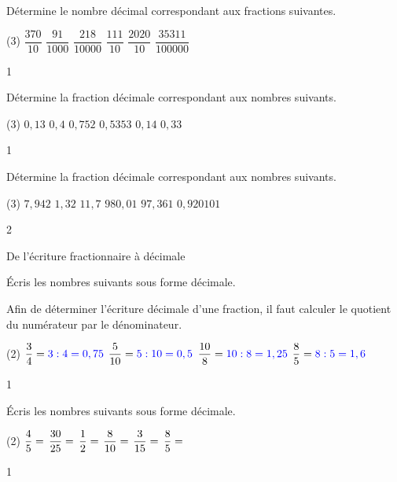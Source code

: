 \documentclass[a4paper,11pt]{report}
\begin{document}
\begin{exo}{
	Détermine le nombre décimal correspondant aux fractions suivantes.
	\begin{tasks}(3)
		\task $\dfrac{370}{10}$
		\task $\dfrac{91}{1000}$
		\task $\dfrac{218}{10000}$
		\task $\dfrac{111}{10}$
		\task $\dfrac{2020}{10}$
		\task $\dfrac{35311}{100000}$
	\end{tasks}
 \vspace{1pt}
}{1}\end{exo}


\begin{exo}{
	Détermine la fraction décimale correspondant aux nombres suivants.
	\begin{tasks}[after-item-skip=0.2em, after-skip=-0.5em](3)
		\task $0,13$
		\task $0,4$
		\task $0,752$
		\task $0,5353$
		\task $0,14$
		\task $0,33$
	\end{tasks}
 \vspace{1pt}
}{1}\end{exo}


\begin{exo}{
	Détermine la fraction décimale correspondant aux nombres suivants.
	\begin{tasks}[after-item-skip=0.2em](3)
		\task $7,942$
		\task $1,32$
		\task $11,7$
		\task $980,01$
		\task $97,361$
		\task $0,920101$
	\end{tasks}
 \vspace{1pt}
}{2}\end{exo}

\begin{resolu}{De l'écriture fractionnaire à décimale}
{Écris les nombres suivants sous forme décimale.

{\color{blue} Afin de déterminer l'écriture décimale d'une fraction, il faut calculer le quotient du numérateur par le dénominateur.}

\begin{tasks}(2)
    \task $\dfrac{3}{4}={{\color{blue}3\div 4=0,75}}$
    \task $\dfrac{5}{10}={{\color{blue}5\div 10=0,5}}$
    \task $\dfrac{10}{8}={{\color{blue}10\div 8=1,25}}$
    \task $\dfrac{8}{5}={{\color{blue}8\div 5=1,6}}$
\end{tasks}
 \vspace{1pt}
}{1}
\end{resolu}

\begin{exop}{
Écris les nombres suivants sous forme décimale.
\begin{tasks}(2)
	\task $\dfrac{4}{5}=\hrulefill$\hspace{0.5cm}
    \task $\dfrac{30}{25}=\hrulefill$
    \task $\dfrac{1}{2}=\hrulefill$\hspace{0.5cm}
    \task $\dfrac{8}{10}=\hrulefill$
    \task $\dfrac{3}{15}=\hrulefill$\hspace{0.5cm}
    \task $\dfrac{8}{5}=\hrulefill$
\end{tasks}
 \vspace{1pt}

}{1}\end{exop}
\end{document}

